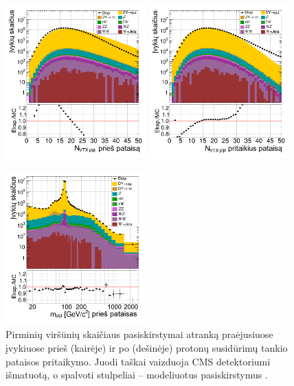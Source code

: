 \documentclass[a4paper, 12pt, oneside]{article}
\begin{document}
\begin{figure}[b!]
	\RawFloats
	\includegraphics[width=0.48\textwidth]{Kursinis3/mumu_nVTX_before.png}
	\includegraphics[width=0.48\textwidth]{Kursinis3/mumu_nVTX_after.png}
	\vspace{-0.5cm}
	\caption{\label{fig:PUba} Pirminių viršūnių skaičiaus pasiskirstymai atranką praėjusiuose įvykiuose prieš (kairėje)
		ir po (dešinėje) protonų susidūrimų tankio pataisos pritaikymo.
		Juodi taškai vaizduoja CMS detektoriumi išmatuotą, o spalvoti stulpeliai -- modeliuotus pasiskirstymus \cite{MAk2}.}
	\includegraphics[width=0.48\textwidth]{Kursinis3/mumu_mass_before.png}

\end{figure}
\end{document}
